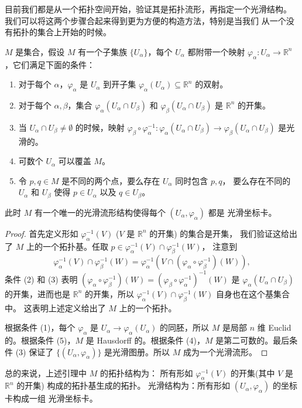 \documentclass[fontset=none]{Notes}
\begin{document}
目前我们都是从一个拓扑空间开始，验证其是拓扑流形，再指定一个光滑结构。
我们可以将这两个步骤合起来得到更为方便的构造方法，特别是当我们
从一个没有拓扑的集合上开始的时候。

\begin{lemma}[光滑流形坐标卡引理]\label{lemma:smooth manifold chart}
  $M$ 是集合，假设 $M$ 有一个子集族 $\{U_\alpha\}$，每个 $U_\alpha$ 都附带一个映射
  $\varphi_\alpha:U_\alpha\to\mathbb{R}^n$，它们满足下面的条件：
  \begin{enumerate}
    \item 对于每个 $\alpha$，$\varphi_\alpha$ 是 $U_\alpha$ 到开子集
    $\varphi_\alpha(U_\alpha)\subseteq\mathbb{R}^n$ 的双射。
    \item 对于每个 $\alpha,\beta$，集合 $\varphi_\alpha(U_\alpha\cap U_\beta)$
    和 $\varphi_\beta(U_\alpha\cap U_\beta)$ 是 $\mathbb{R}^n$ 的开集。
    \item 当 $U_\alpha\cap U_\beta\neq\emptyset$ 的时候，映射
    $\varphi_\beta\circ\varphi_\alpha^{-1}:\varphi_\alpha(U_\alpha\cap U_\beta)\to\varphi_\beta(U_\alpha\cap U_\beta)$
    是光滑的。
    \item 可数个 $U_\alpha$ 可以覆盖 $M$。
    \item 令 $p,q\in M$ 是不同的两个点，要么存在 $U_\alpha$ 同时包含 $p,q$，
    要么存在不同的 $U_\alpha$ 和 $U_\beta$ 使得 $p\in U_\alpha$ 以及 $q\in U_\beta$。
  \end{enumerate}
  此时 $M$ 有一个唯一的光滑流形结构使得每个 $(U_\alpha,\varphi_\alpha)$ 都是
  光滑坐标卡。
\end{lemma}
\begin{proof}
  首先定义形如 $\varphi_\alpha^{-1}(V)$ ($V$ 是 $\mathbb{R}^n$ 的开集) 的集合是开集，
  我们验证这给出了 $M$ 上的一个拓扑基。任取 $p\in\varphi_\alpha^{-1}(V)\cap \varphi_\beta^{-1}(W)$，
  注意到
  \[
    \varphi_\alpha^{-1}(V)\cap \varphi_\beta^{-1}(W)=\varphi_\alpha^{-1}
    \left(V\cap (\varphi_\alpha\circ\varphi_\beta^{-1})(W)\right),
  \]
  条件 (2) 和 (3) 表明 $(\varphi_\alpha\circ\varphi_\beta^{-1})(W)=(\varphi_\beta\circ\varphi_\alpha^{-1})^{-1}(W)$ 是 $\varphi_\alpha(U_\alpha\cap U_\beta)$
  的开集，进而也是 $\mathbb{R}^n$ 的开集，所以 
  $\varphi_\alpha^{-1}(V)\cap \varphi_\beta^{-1}(W)$ 自身也在这个基集合中。
  这表明上述定义给出了 $M$ 上的一个拓扑。

  根据条件 (1)，每个 $\varphi_\alpha$ 是 $U_\alpha\to\varphi_\alpha(U_\alpha)$
  的同胚，所以 $M$ 是局部 $n$ 维 Euclid 的。根据条件 (5)，$M$ 是
  Hausdorff 的。根据条件 (4)，$M$ 是第二可数的。最后条件 (3) 保证了
  $\{(U_\alpha,\varphi_\alpha)\}$ 是光滑图册。所以 $M$ 成为一个光滑流形。
\end{proof}
\begin{remark}
  总的来说，上述引理中 $M$ 的拓扑结构为：
  所有形如 $\varphi_\alpha^{-1}(V)$ 的开集(其中 $V$ 是 $\mathbb{R}^n$ 的开集)
  构成的拓扑基生成的拓扑。
  光滑结构为：所有形如 $(U_\alpha,\varphi_\alpha)$ 的坐标卡构成一组
  光滑坐标卡。
\end{remark}
\end{document}
